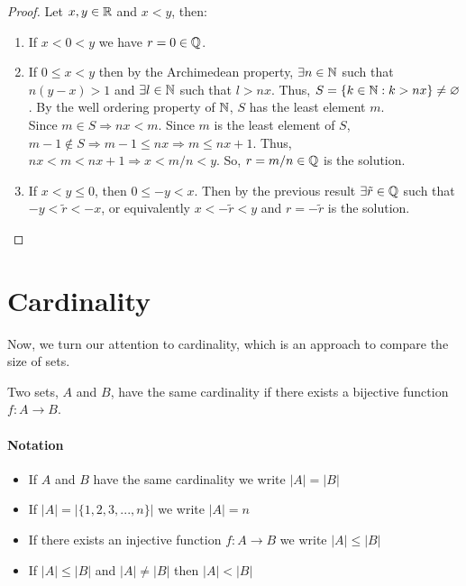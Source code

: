 \begin{proof}
    Let $x, y \in \mathbb{R}$ and $x < y$, then:
    \begin{enumerate}
        \item If $x < 0 < y$ we have $r = 0 \in \mathbb{Q}$.
        \item If $0 \leq x < y$ then by the Archimedean property, $\exists n \in \mathbb{N}$ such that $n(y-x) > 1$ and $\exists l \in \mathbb{N}$ such that $l > nx$. Thus, $S = \{ k \in \mathbb{N}: k > nx\} \neq \varnothing$. By the well ordering property of $\mathbb{N}$, $S$ has the least element $m$.\\
        Since $m \in S \Rightarrow nx < m$. Since $m$ is the least element of $S$, $m-1 \notin S \Rightarrow m-1 \leq nx \Rightarrow m \leq nx + 1$. Thus, $nx < m < nx + 1 \Rightarrow x < m/n < y$. So, $r = m/n \in \mathbb{Q}$ is the solution.
        \item If $x < y \leq 0$, then $0 \leq -y < x$. Then by the previous result $\exists \tilde{r} \in \mathbb{Q}$ such that $-y < \tilde{r} < -x$, or equivalently $x < -\tilde{r} < y$ and $r = -\tilde{r}$ is the solution.
    \end{enumerate}
\end{proof}

\section{Cardinality}

Now, we turn our attention to cardinality, which is an approach to compare the size of sets.

\begin{definition}[Cardinality]
    Two sets, $A$ and $B$, have the same cardinality if there exists a bijective function $f: A \to B$.
\end{definition}

\paragraph{Notation}

\begin{itemize}
    \item If $A$ and $B$ have the same cardinality we write $|A| = |B|$
    \item If $|A| = |\{ 1, 2, 3, ..., n\}|$ we write $|A| = n$
    \item If there exists an injective function $f: A \to B$ we write $|A| \leq |B|$
    \item If $|A| \leq |B|$ and $|A| \neq |B|$ then $|A| < |B|$
\end{itemize}

